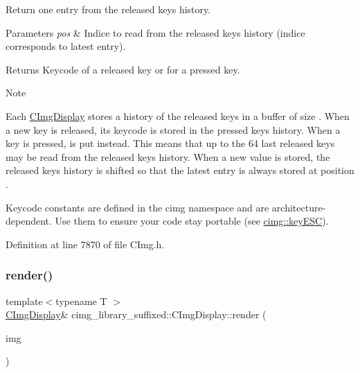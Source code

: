 Return one entry from the released keys history. 


\begin{DoxyParams}{Parameters}
{\em pos} & Indice to read from the released keys history (indice {} corresponds to latest entry). \\
\hline
\end{DoxyParams}
\begin{DoxyReturn}{Returns}
Keycode of a released key or {} for a pressed key. 
\end{DoxyReturn}
\begin{DoxyNote}{Note}

\begin{DoxyItemize}
\item Each \hyperlink{structcimg__library__suffixed_1_1CImgDisplay}{C\+Img\+Display} stores a history of the released keys in a buffer of size {}. When a new key is released, its keycode is stored in the pressed keys history. When a key is pressed, {} is put instead. This means that up to the 64 last released keys may be read from the released keys history. When a new value is stored, the released keys history is shifted so that the latest entry is always stored at position {}.
\item Keycode constants are defined in the cimg namespace and are architecture-\/dependent. Use them to ensure your code stay portable (see \hyperlink{namespacecimg__library__suffixed_1_1cimg_abaabb7beac6bae90502bd8378f7037f9}{cimg\+::key\+E\+SC}). 
\end{DoxyItemize}
\end{DoxyNote}


Definition at line 7870 of file C\+Img.\+h.

\mbox{\label{structcimg__library__suffixed_1_1CImgDisplay_a267d574c78d29cd9f475a30b206882c6}} 
\subsubsection{\texorpdfstring{render()}{render()}}
{\footnotesize\ttfamily template$<$typename T $>$ \\
\hyperlink{structcimg__library__suffixed_1_1CImgDisplay}{C\+Img\+Display}\& cimg\+\_\+library\+\_\+suffixed\+::\+C\+Img\+Display\+::render (\begin{DoxyParamCaption}\item[{const \hyperlink{structcimg__library__suffixed_1_1CImg}{C\+Img}$<$ T $>$ \&}]{img }\end{DoxyParamCaption})\hspace{0.3cm}{\ttfamily [inline]}}



